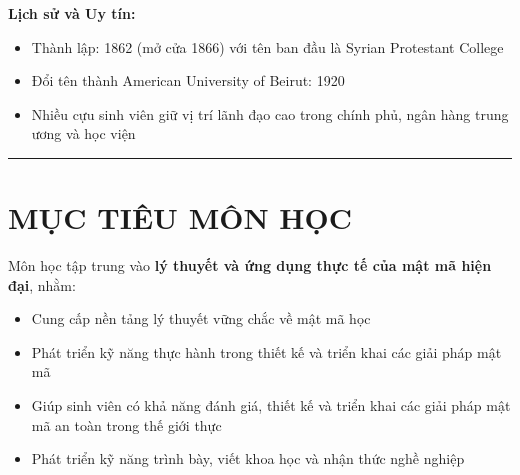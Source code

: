 \textbf{Lịch sử và Uy tín:}
\begin{itemize}
\item Thành lập: 1862 (mở cửa 1866) với tên ban đầu là Syrian Protestant College
\item Đổi tên thành American University of Beirut: 1920
\item Nhiều cựu sinh viên giữ vị trí lãnh đạo cao trong chính phủ, ngân hàng trung ương và học viện
\end{itemize}

\vspace{0.5cm}
\rule{\textwidth}{1pt}
\vspace{0.5cm}

\section{MỤC TIÊU MÔN HỌC}

Môn học tập trung vào \textbf{lý thuyết và ứng dụng thực tế của mật mã hiện đại}, nhằm:

\begin{itemize}
\item Cung cấp nền tảng lý thuyết vững chắc về mật mã học
\item Phát triển kỹ năng thực hành trong thiết kế và triển khai các giải pháp mật mã
\item Giúp sinh viên có khả năng đánh giá, thiết kế và triển khai các giải pháp mật mã an toàn trong thế giới thực
\item Phát triển kỹ năng trình bày, viết khoa học và nhận thức nghề nghiệp
\end{itemize}
